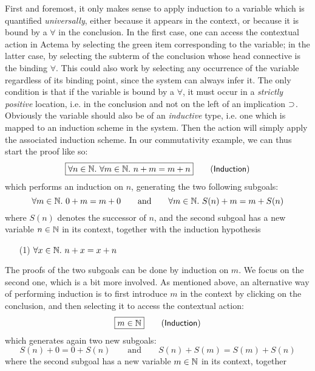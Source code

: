 First and foremost, it only makes sense to apply induction to a variable which
is quantified \emph{universally}, either because it appears in the context, or
because it is bound by a $\forall$ in the conclusion. In the first case, one can
access the contextual action in Actema by selecting the green item corresponding
to the variable; in the latter case, by selecting the subterm of the conclusion
whose head connective is the binding $\forall$. This could also work by selecting any
occurrence of the variable regardless of its binding point, since the system can
always infer it. The only condition is that if the variable is bound by a
$\forall$, it must occur in a \emph{strictly positive} location, i.e. in the
conclusion and not on the left of an implication $\supset$. Obviously the variable
should also be of an \emph{inductive} type, i.e. one which is mapped to an
induction scheme in the system. Then the 
action will simply apply the associated induction scheme. In our commutativity
example, we can thus start the proof like so:
$$\fbox{$\forall n \in \mathbb{N}.\ \forall m \in \mathbb{N}.\ n + m = m + n$} \qquad
\text{(\textsf{Induction})}$$
which performs an induction on $n$, generating the two following subgoals:
$$\forall m \in \mathbb{N}.\ 0 + m = m + 0 \qquad \text{and} \qquad \forall m \in \mathbb{N}.\ S(n) + m = m + S(n)$$
where $S(n)$ denotes the successor of $n$, and the second subgoal has a new
variable $n \in \mathbb{N}$ in its context, together with the induction hypothesis
\begin{itemize}
  \item[(1)] $\forall x \in \mathbb{N}.\ n + x = x + n$
\end{itemize}
The proofs of the two subgoals can be done by induction on $m$. We focus on the
second one, which is a bit more involved. As mentioned above, an alternative way
of performing induction is to first introduce $m$ in the context by clicking on
the conclusion, and then selecting it to access the contextual action:
$$\fbox{$m \in \mathbb{N}$} \qquad \text{(\textsf{Induction})}$$
which generates again two new subgoals:
$$S(n) + 0 = 0 + S(n) \qquad \text{and} \qquad S(n) + S(m) = S(m) + S(n)$$ where
the second subgoal has a new variable $m \in \mathbb{N}$ in its context, together
